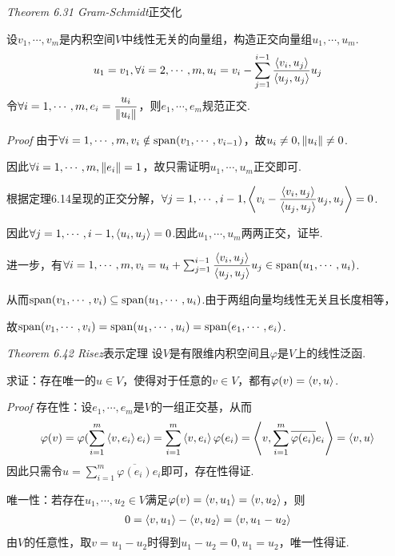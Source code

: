 \textit{Theorem 6.31 Gram-Schmidt}{\kaishu 正交化}

设\(v_1,\cdots,v_m\)是内积空间\(V\)中线性无关的向量组，构造正交向量组\(u_1,\cdots,u_m\).
    \begin{align*}
        u_1=v_1,\forall i=2,\cdots,m,u_i=v_i-\sum_{j=1}^{i-1} \dfrac{\left\langle v_i,u_j \right\rangle}{\left\langle u_j,u_j \right\rangle}u_j
    \end{align*}
令\(\forall i=1,\cdots,m,e_i=\dfrac{u_i}{\left\lVert u_i \right\rVert}\)，则\(e_1,\cdots,e_m\)规范正交.

\textit{Proof}
由于\(\forall i=1,\cdots,m,v_i \notin \mathrm{span}(v_1,\cdots,v_{i-1})\)，故\(u_i \ne 0,\left\lVert u_i \right\rVert \ne 0\).

因此\(\forall i=1,\cdots,m,\left\lVert e_i \right\rVert=1\)，故只需证明\(u_1,\cdots,u_m\)正交即可.

根据定理6.14呈现的正交分解，\(\forall j=1,\cdots,i-1,\left\langle v_i-\dfrac{\left\langle v_i,u_j \right\rangle}{\left\langle u_j,u_j \right\rangle}u_j,u_j \right\rangle=0\).

因此\(\forall j=1,\cdots,i-1,\left\langle u_i,u_j \right\rangle=0\).因此\(u_1,\cdots,u_m\)两两正交，证毕.

进一步，有\(\forall i=1,\cdots,m,v_i=u_i+\sum_{j=1}^{i-1} \dfrac{\left\langle v_i,u_j \right\rangle}{\left\langle u_j,u_j \right\rangle}u_j \in \mathrm{span}(u_1,\cdots,u_i)\).

从而\(\mathrm{span}(v_1,\cdots,v_i) \subseteq \mathrm{span}(u_1,\cdots,u_i)\).由于两组向量均线性无关且长度相等，

故\(\mathrm{span}(v_1,\cdots,v_i)=\mathrm{span}(u_1,\cdots,u_i)=\mathrm{span}(e_1,\cdots,e_i)\).

\hspace*{\fill}

\textit{Theorem 6.42 Risez}{\kaishu 表示定理}
设\(V\)是有限维内积空间且\(\varphi\)是\(V\)上的线性泛函.

求证：存在唯一的\(u \in V\)，使得对于任意的\(v \in V\)，都有\(\varphi(v)=\left\langle v,u \right\rangle\).

\textit{Proof}
存在性：设\(e_1,\cdots,e_m\)是\(V\)的一组正交基，从而
    \begin{align*}
        \varphi(v)=\varphi(\sum_{i=1}^m \left\langle v,e_i \right\rangle e_i)=\sum_{i=1}^m \left\langle v,e_i \right\rangle\varphi(e_i)
        =\left\langle v,\sum_{i=1}^m \overline{\varphi(e_i)}e_i \right\rangle=\left\langle v,u \right\rangle
    \end{align*}
因此只需令\(u=\sum_{i=1}^m \overline{\varphi(e_i)}e_i\)即可，存在性得证.

唯一性：若存在\(u_1,\cdots,u_2 \in V\)满足\(\varphi(v)=\left\langle v,u_1 \right\rangle=\left\langle v,u_2 \right\rangle\)，则
    \begin{align*}
        0=\left\langle v,u_1 \right\rangle-\left\langle v,u_2 \right\rangle=\left\langle v,u_1-u_2 \right\rangle
    \end{align*}
由\(V\)的任意性，取\(v=u_1-u_2\)时得到\(u_1-u_2=0,u_1=u_2\)，唯一性得证.

